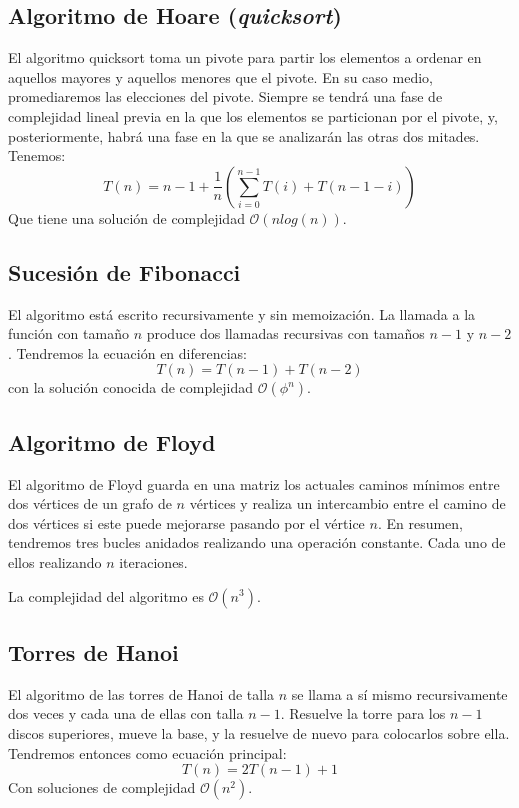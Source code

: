 \documentclass[a4paper, 11pt]{article} %
\begin{document}
\subsection{Algoritmo de Hoare (\textit{quicksort})}
El algoritmo quicksort toma un pivote para partir los elementos a ordenar en aquellos mayores y aquellos menores que el pivote.
En su caso medio, promediaremos las elecciones del pivote. Siempre se tendrá una fase de complejidad lineal previa en la que los
elementos se particionan por el pivote, y, posteriormente, habrá una fase en la que se analizarán las otras dos mitades. Tenemos:
\begin{equation}
 T(n) = n - 1 + \frac{1}{n}\left(\sum_{i=0}^{n-1} T(i) + T(n-1-i) \right)
\end{equation}
Que tiene una solución de complejidad $\mathcal{O}(nlog(n))$.


\subsection {Sucesión de Fibonacci}
El algoritmo está escrito recursivamente y sin memoización. La llamada a la función con tamaño $n$ produce 
dos llamadas recursivas con tamaños $n-1$ y $n-2$. Tendremos la ecuación en diferencias:
\begin{equation}
 T(n) = T(n-1) + T(n-2)
\end{equation}
con la solución conocida de complejidad $\mathcal{O}(\phi^n)$.

\subsection{Algoritmo de Floyd}
El algoritmo de Floyd guarda en una matriz los actuales caminos mínimos entre dos vértices de un grafo de $n$ vértices
y realiza un intercambio entre el camino de dos vértices si este puede mejorarse pasando por el vértice $n$. En resumen,
tendremos tres bucles anidados realizando una operación constante. Cada uno de ellos realizando $n$ iteraciones.

La complejidad del algoritmo es $\mathcal{O}(n^3)$.


\subsection{Torres de Hanoi}
El algoritmo de las torres de Hanoi de talla $n$ se llama a sí mismo recursivamente dos veces y cada una de ellas con
talla $n-1$. Resuelve la torre para los $n-1$ discos superiores, mueve la base, y la resuelve de nuevo para colocarlos sobre ella.
Tendremos entonces como ecuación principal:
\begin{equation}
 T(n) = 2T(n-1) + 1
\end{equation}
Con soluciones de complejidad $\mathcal{O}(n^2)$.
\end{document}

